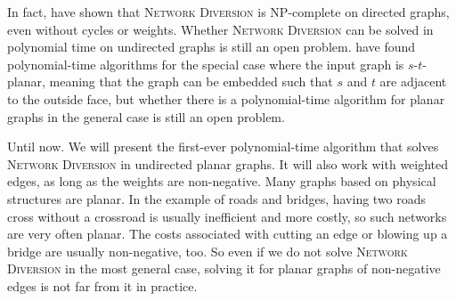In fact, \cite{source:theoretical-and-computational-advances-for-network-diversion} have shown that \textsc{Network Diversion} is NP-complete on directed graphs, even without cycles or weights. Whether \textsc{Network Diversion} can be solved in polynomial time on undirected graphs is still an open problem. \cite{source:theoretical-and-computational-advances-for-network-diversion} have found polynomial-time algorithms for the special case where the input graph is $s$-$t$-planar, meaning that the graph can be embedded such that $s$ and $t$ are adjacent to the outside face, but whether there is a polynomial-time algorithm for planar graphs in the general case is still an open problem.

Until now. We will present the first-ever polynomial-time algorithm that solves \textsc{Network Diversion} in undirected planar graphs. It will also work with weighted edges, as long as the weights are non-negative. Many graphs based on physical structures are planar. In the example of roads and bridges, having two roads cross without a crossroad is usually inefficient and more costly, so such networks are very often planar. The costs associated with cutting an edge or blowing up a bridge are usually non-negative, too. So even if we do not solve \textsc{Network Diversion} in the most general case, solving it for planar graphs of non-negative edges is not far from it in practice.
